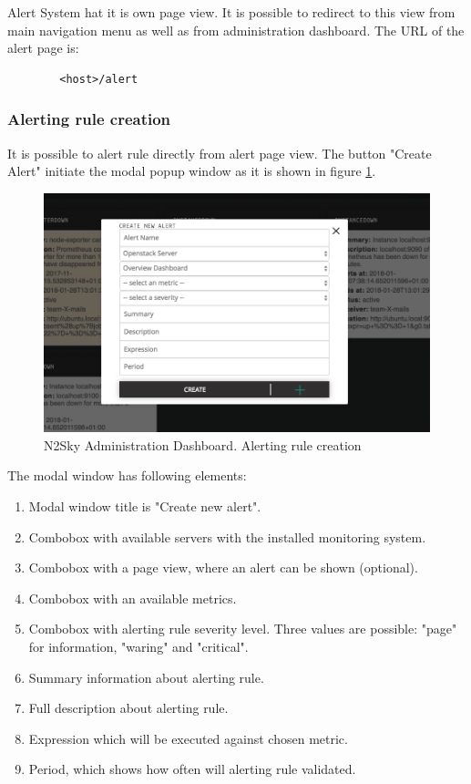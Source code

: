 Alert System hat it is own page view. It is possible to redirect to this view from main navigation menu as well as from administration dashboard. The URL of the alert page is:
\begin{lstlisting}
        <host>/alert
\end{lstlisting}

\subsubsection{Alerting rule creation}\label{Alerting rule creation}

It is possible to alert rule directly from alert page view. The button "Create Alert" initiate the modal popup window as it is shown in figure \ref{fig:alert_create}.

\begin{figure}[htbp]
\begin{center}
  \includegraphics[width=\linewidth]{components/4/pics/alert_create.png}
  \caption{N2Sky Administration Dashboard. Alerting rule creation}
  \label{fig:alert_create}
\end{center}
\end{figure}

The modal window has following elements:
\begin{enumerate}
\item Modal window title is "Create new alert".
\item Combobox with available servers with the installed monitoring system.
\item Combobox with a page view, where an alert can be shown (optional).
\item Combobox with an available metrics.
\item Combobox with alerting rule severity level. Three values are possible: "page" for information, "waring" and "critical".
\item Summary information about alerting rule.
\item Full description about alerting rule.
\item Expression which will be executed against chosen metric.
\item Period, which shows how often will alerting rule validated.
\end{enumerate}



